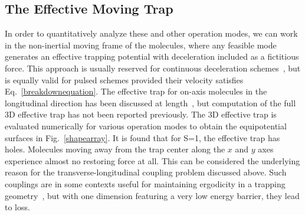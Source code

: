 \subsection{The Effective Moving Trap}
In order to quantitatively analyze these and other operation modes, we can work in the non-inertial moving frame of the molecules, where any feasible mode generates an effective trapping potential with deceleration included as a fictitious force. 
This approach is usually reserved for continuous deceleration schemes~\cite{Osterwalder2010,Narevicius2008}, but is equally valid for pulsed schemes provided their velocity satisfies Eq.~\ref{breakdownequation}. 
The effective trap for on-axis molecules in the longitudinal direction has been discussed at length~\cite{Bethlem2000,Hudson2004}, but computation of the full 3D effective trap has not been reported previously.
The 3D effective trap is evaluated numerically for various operation modes to obtain the equipotential surfaces in Fig.~\ref{shapearray}.
It is found that for S=1, the effective trap has holes. 
Molecules moving away from the trap center along the $x$ and $y$ axes experience almost no restoring force at all. 
This can be considered the underlying reason for the transverse-longitudinal coupling problem discussed above. 
Such couplings are in some contexts useful for maintaining ergodicity in a trapping geometry~\cite{Surkov1996}, but with one dimension featuring a very low energy barrier, they lead to loss.

